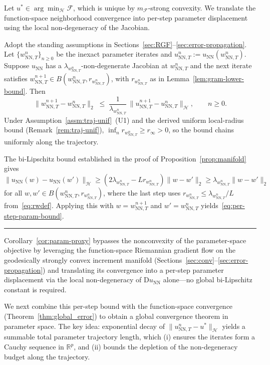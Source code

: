 \documentclass[twoside,11pt]{article}
\newcommand{\BlackBoxProof}{\rule{1.5ex}{1.5ex}}
\renewenvironment{proof}{\par\noindent{\bf Proof\ }}{\hfill\BlackBoxProof\par\medskip}
\newcommand{\R}{\mathbb{R}}
\newcommand{\D}{\mathrm{D}}
\newcommand{\NN}{\mathrm{NN}}
\newcommand{\calF}{\mathcal{F}}
\newcommand{\calH}{\mathcal{H}}
\begin{document}
Let $u^*\in\arg\min_{\calH}\calF$, which is unique by $m_\calF$-strong convexity. We translate the function-space neighborhood convergence into per-step parameter displacement using the local non-degeneracy of the Jacobian.

\begin{corollary}\label{cor:param-proxy}
Adopt the standing assumptions in Sections~\ref{sec:RGF}--\ref{sec:error-propagation}. Let $\{w^n_{\NN,T}\}_{n\ge 0}$ be the inexact parameter iterates and $u^n_{\NN,T}:=u_\NN(w^n_{\NN,T})$. Suppose $u_\NN$ has a $\lambda_{w^n_{\NN,T}}$-non-degenerate Jacobian at $w^n_{\NN,T}$ and the next iterate satisfies $w^{n+1}_{\NN,T}\in B(w^n_{\NN,T},r_{w^n_{\NN,T}})$, with $r_{w^n_{\NN,T}}$ as in Lemma~\ref{lem:gram-lower-bound}. Then
\begin{equation}\label{eq:per-step-param-bound}
\|w^{n+1}_{\NN,T}-w^n_{\NN,T}\|_2
\;\le\; \frac{1}{\lambda_{w^n_{\NN,T}}}\,\|u^{n+1}_{\NN,T}-u^n_{\NN,T}\|_\calH,
\qquad n\ge 0.
\end{equation}
Under Assumption~\ref{assm:traj-unif}~(U1) and the derived uniform local-radius bound (Remark~\ref{rem:traj-unif}), $\inf_n r_{w^n_{\NN,T}}\ge r_\infty>0$, so the bound chains uniformly along the trajectory.
\end{corollary}

\begin{proof}
The bi-Lipschitz bound established in the proof of Proposition~\ref{prop:manifold} gives
$\|u_\NN(w)-u_\NN(w')\|_\calH \ge (2\lambda_{w^n_{\NN,T}}-L r_{w^n_{\NN,T}})\|w-w'\|_2 \ge \lambda_{w^n_{\NN,T}}\|w-w'\|_2$
for all $w,w'\in B(w^n_{\NN,T},r_{w^n_{\NN,T}})$, where the last step uses $r_{w^n_{\NN,T}}\le \lambda_{w^n_{\NN,T}}/L$ from~\eqref{eq:rwdef}. Applying this with $w=w^{n+1}_{\NN,T}$ and $w'=w^n_{\NN,T}$ yields~\eqref{eq:per-step-param-bound}.
\end{proof}

Corollary~\ref{cor:param-proxy} bypasses the nonconvexity of the parameter-space objective by leveraging the function-space Riemannian gradient flow on the geodesically strongly convex increment manifold (Sections~\ref{sec:conv}--\ref{sec:error-propagation}) and translating its convergence into a per-step parameter displacement via the local non-degeneracy of $\D u_\NN$ alone---no global bi-Lipschitz constant is required.

We next combine this per-step bound with the function-space convergence (Theorem~\ref{thm:global_error}) to obtain a global convergence theorem in parameter space. The key idea: exponential decay of $\|u^n_{\NN,T}-u^*\|_\calH$ yields a summable total parameter trajectory length, which (i) ensures the iterates form a Cauchy sequence in $\R^p$, and (ii) bounds the depletion of the non-degeneracy budget along the trajectory.
\end{document}
